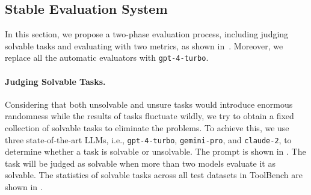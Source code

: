 \subsection{Stable Evaluation System}
\label{sec:evaluation_system}

In this section, we propose a two-phase evaluation process, including judging solvable tasks and evaluating with two metrics, as shown in~. Moreover, we replace all the automatic evaluators with \texttt{gpt-4-turbo}.

\paragraph{Judging Solvable Tasks.}\label{sec:judge_solvable_tasks}
\begin{table}[t!]
  \centering
  \small
  \caption{Statistics of original full and solvable tasks before and after judging. \texttt{C,I,T} stands for the Category, Instruction and Tool subgroup of the test set. Experiments below follow the denotation.}
  \label{tab:task_filteration}
\end{table}
Considering that both unsolvable and unsure tasks would introduce enormous randomness while the results of tasks fluctuate wildly, we try to obtain a fixed collection of solvable tasks to eliminate the problems.
To achieve this, we use three state-of-the-art LLMs, i.e., \texttt{gpt-4-turbo}, \texttt{gemini-pro}, and \texttt{claude-2}, to determine whether a task is solvable or unsolvable.
The prompt is shown in .
The task will be judged as solvable when more than two models evaluate it as solvable.
The statistics of solvable tasks across all test datasets in ToolBench are shown in . 

